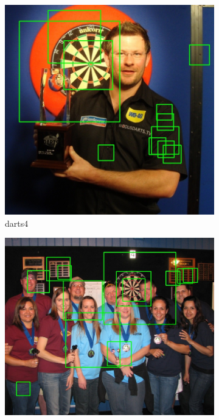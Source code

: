 \documentclass[conference]{IEEEtran}
\begin{document}
\par
\begin{figure}[htb]
\centering
\begin{subfigure}{.5\linewidth}
  \centering
  \includegraphics[width=.9\linewidth]{images/task2/detected4.jpg}
  \caption{darts4}
  \label{fig:sub1}
\end{subfigure}%
\begin{subfigure}{.5\linewidth}
  \centering
  \vspace{0.7cm}
  \includegraphics[width=.9\linewidth]{images/task2/detected5.jpg}

\end{subfigure}
\end{figure}
\end{document}
